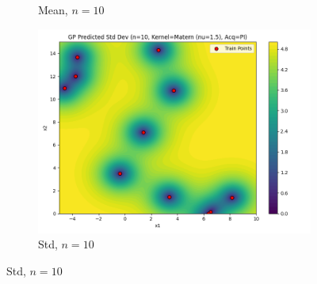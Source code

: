 \documentclass[a4paper,12pt]{article}
\begin{document}
\begin{figure}[H]
\begin{subfigure}{0.3\textwidth}
    \caption{Mean, $n=10$}
\end{subfigure}
\begin{subfigure}{0.3\textwidth}
    \includegraphics[width=\linewidth]{Task-02/images/gp_std_matern_n10_PI.png}
    \caption{Std, $n=10$}
\end{subfigure}


\end{figure}
\end{document}
